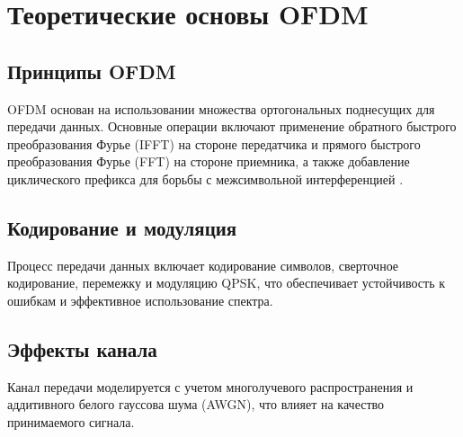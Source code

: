 \chapter{Теоретические основы OFDM}

\section{Принципы OFDM}

OFDM основан на использовании множества ортогональных поднесущих для передачи данных. Основные операции включают применение обратного быстрого преобразования Фурье (IFFT) на стороне передатчика и прямого быстрого преобразования Фурье (FFT) на стороне приемника, а также добавление циклического префикса для борьбы с межсимвольной интерференцией \cite{oppenheim1999}.

\section{Кодирование и модуляция}

Процесс передачи данных включает кодирование символов, сверточное кодирование, перемежку и модуляцию QPSK, что обеспечивает устойчивость к ошибкам и эффективное использование спектра.

\section{Эффекты канала}

Канал передачи моделируется с учетом многолучевого распространения и аддитивного белого гауссова шума (AWGN), что влияет на качество принимаемого сигнала.